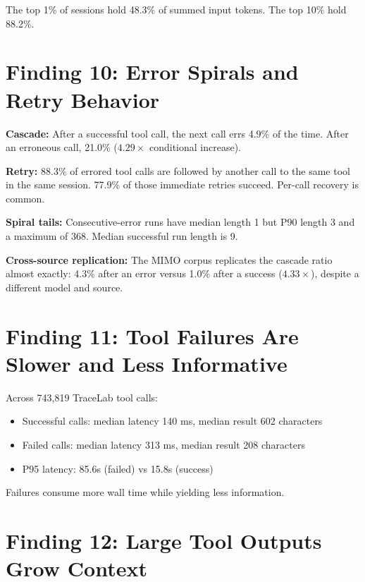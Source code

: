 \documentclass[11pt]{article}
\begin{document}
The top 1\% of sessions hold 48.3\% of summed input tokens. The top 10\% hold
88.2\%.

\section{Finding 10: Error Spirals and Retry Behavior}

\textbf{Cascade:} After a successful tool call, the next call errs 4.9\% of
the time. After an erroneous call, 21.0\% ($4.29\times$ conditional increase).

\textbf{Retry:} 88.3\% of errored tool calls are followed by another call to
the same tool in the same session. 77.9\% of those immediate retries succeed.
Per-call recovery is common.

\textbf{Spiral tails:} Consecutive-error runs have median length 1 but P90
length 3 and a maximum of 368. Median successful run length is 9.

\textbf{Cross-source replication:} The MIMO corpus replicates the cascade
ratio almost exactly: 4.3\% after an error versus 1.0\% after a success
($4.33\times$), despite a different model and source.

\section{Finding 11: Tool Failures Are Slower and Less Informative}

Across 743{,}819 TraceLab tool calls:

\begin{itemize}[nosep]
\item Successful calls: median latency 140 ms, median result 602 characters
\item Failed calls: median latency 313 ms, median result 208 characters
\item P95 latency: 85.6s (failed) vs 15.8s (success)
\end{itemize}

Failures consume more wall time while yielding less information.

\section{Finding 12: Large Tool Outputs Grow Context}
\end{document}
